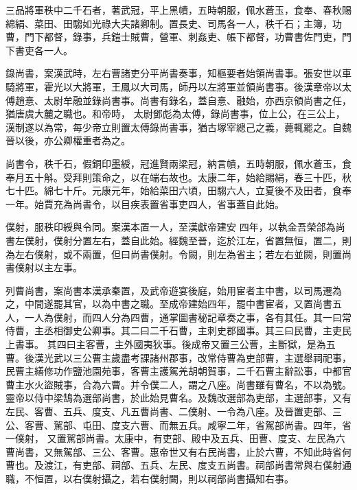 \begin{pinyinscope}
 三品將軍秩中二千石者，著武冠，平上黑幘，五時朝服，佩水蒼玉，食奉、春秋賜綿絹、菜田、田騶如光祿大夫諸卿制。置長史、司馬各一人，秩千石；主簿，功曹，門下都督，錄事，兵鎧士賊曹，營軍、刺姦吏、帳下都督，功曹書佐門吏，門下書吏各一人。



 錄尚書，案漢武時，左右曹諸吏分平尚書奏事，知樞要者始領尚書事。張安世以車騎將軍，霍光以大將軍，王鳳以大司馬，師丹以左將軍並領尚書事。後漢章帝以太傅趙憙、太尉牟融並錄尚書事。尚書有錄名，蓋自憙、融始，亦西京領尚書之任，猶唐虞大麓之職也。和帝時，
 太尉鄧彪為太傅，錄尚書事，位上公，在三公上，漢制遂以為常，每少帝立則置太傅錄尚書事，猶古塚宰總己之義，薨輒罷之。自魏晉以後，亦公卿權重者為之。



 尚書令，秩千石，假銅印墨綬，冠進賢兩梁冠，納言幘，五時朝服，佩水蒼玉，食奉月五十斛。受拜則策命之，以在端右故也。太康二年，始給賜絹，春三十匹，秋七十匹。綿七十斤。元康元年，始給菜田六頃，田騶六人，立夏後不及田者，食奉一年。始賈充為尚書令，以目疾表置省事吏四人，省事蓋自此始。



 僕射，服秩印綬與令同。案漢本置一人，至漢獻帝建安
 四年，以執金吾榮郃為尚書左僕射，僕射分置左右，蓋自此始。經魏至晉，迄於江左，省置無恒，置二，則為左右僕射，或不兩置，但曰尚書僕射。令闕，則左為省主；若左右並闕，則置尚書僕射以主左事。



 列曹尚書，案尚書本漢承秦置，及武帝遊宴後庭，始用宦者主中書，以司馬遷為之，中間遂罷其官，以為中書之職。至成帝建始四年，罷中書宦者，又置尚書五人，一人為僕射，而四人分為四曹，通掌圖書秘記章奏之事，各有其任。其一曰常侍曹，主丞相御史公卿事。其二曰二千石曹，主刺史郡國事。其三曰民曹，主吏民上書事。
 其四曰主客曹，主外國夷狄事。後成帝又置三公曹，主斷獄，是為五曹。後漢光武以三公曹主歲盡考課諸州郡事，改常侍曹為吏部曹，主選舉祠祀事，民曹主繕修功作鹽池園苑事，客曹主護駕羌胡朝賀事，二千石曹主辭訟事，中都官曹主水火盜賊事，合為六曹。并令僕二人，謂之八座。尚書雖有曹名，不以為號。靈帝以侍中梁鵠為選部尚書，於此始見曹名。及魏改選部為吏部，主選部事，又有左民、客曹、五兵、度支、凡五曹尚書、二僕射、一令為八座。及晉置吏部、三公、客曹、駕部、屯田、度支六曹、而無五兵。咸寧二年，省駕部尚書。四年，省一僕射，
 又置駕部尚書。太康中，有吏部、殿中及五兵、田曹、度支、左民為六曹尚書，又無駕部、三公、客曹。惠帝世又有右民尚書，止於六曹，不知此時省何曹也。及渡江，有吏部、祠部、五兵、左民、度支五尚書。祠部尚書常與右僕射通職，不恒置，以右僕射攝之，若右僕射闕，則以祠部尚書攝知右事。




\end{pinyinscope}
